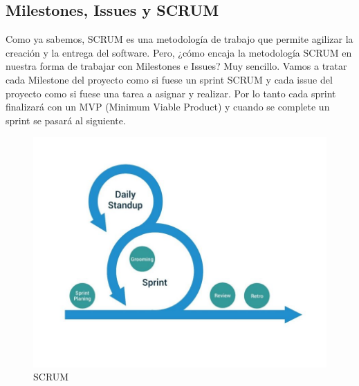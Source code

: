 \subsection{Milestones, Issues y SCRUM}
\begin{text}
	Como ya sabemos, SCRUM es una metodología de trabajo que permite agilizar la creación y la entrega del software. Pero, ¿cómo encaja la metodología SCRUM en nuestra forma de trabajar con Milestones e Issues? Muy sencillo. Vamos a tratar cada Milestone del proyecto como si fuese un sprint SCRUM y cada issue del proyecto como si fuese una tarea a asignar y realizar. Por lo tanto cada sprint finalizará con un MVP (Minimum Viable Product) y cuando se complete un sprint se pasará al siguiente.
	
	\begin{figure}[!hbt]
		\centering
		\includegraphics[scale=0.5]{imagenes/Planificacion/scrum.jpg}
		\caption[SCRUM]{SCRUM \cite{scrum:online}}
		\label{scrum_plan}
	\end{figure}
	\clearpage
	

\end{text}
